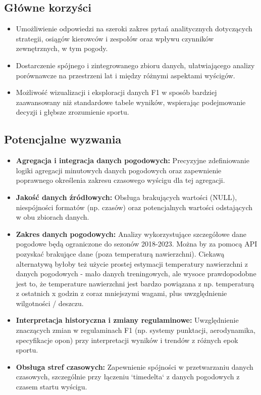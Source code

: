 \documentclass[a4paper,12pt]{article}
\begin{document}
\subsection{Główne korzyści}
\begin{itemize}[label=\textbullet, leftmargin=*]
  \item Umożliwienie odpowiedzi na szeroki zakres pytań analitycznych dotyczących strategii, osiągów kierowców i zespołów oraz wpływu czynników zewnętrznych, w tym pogody.
  \item Dostarczenie spójnego i zintegrowanego zbioru danych, ułatwiającego analizy porównawcze na przestrzeni lat i między różnymi aspektami wyścigów.
  \item Możliwość wizualizacji i eksploracji danych F1 w sposób bardziej zaawansowany niż standardowe tabele wyników, wspierając podejmowanie decyzji i głębsze zrozumienie sportu.
\end{itemize}

\subsection{Potencjalne wyzwania}
\begin{itemize}[label=\textbullet, leftmargin=*]
  \item \textbf{Agregacja i integracja danych pogodowych:} Precyzyjne zdefiniowanie logiki agregacji minutowych danych pogodowych oraz zapewnienie poprawnego określenia zakresu czasowego wyścigu dla tej agregacji.
  \item \textbf{Jakość danych źródłowych:} Obsługa brakujących wartości (NULL), niespójności formatów (np. czasów) oraz potencjalnych wartości odstających w obu zbiorach danych.
  \item \textbf{Zakres danych pogodowych:} Analizy wykorzystujące szczegółowe dane pogodowe będą ograniczone do sezonów 2018-2023. Można by za pomocą API pozyskać brakujące dane (poza temperaturą nawierzchni). Ciekawą alternatywą byłoby też użycie prostej estymacji temperatury nawierzchni z danych pogodowych - mało danych treningowych, ale wysoce prawdopodobne jest to, że temperature nawierzchni jest bardzo powiązana z np. temperaturą z ostatnich x godzin z coraz mniejszymi wagami, plus uwzględnienie wilgotności / deszczu.
  \item \textbf{Interpretacja historyczna i zmiany regulaminowe:} Uwzględnienie znaczących zmian w regulaminach F1 (np. systemy punktacji, aerodynamika, specyfikacje opon) przy interpretacji wyników i trendów z różnych epok sportu.
  \item \textbf{Obsługa stref czasowych:} Zapewnienie spójności w przetwarzaniu danych czasowych, szczególnie przy łączeniu `timedelta` z danych pogodowych z czasem startu wyścigu.
\end{itemize}

\end{document}
